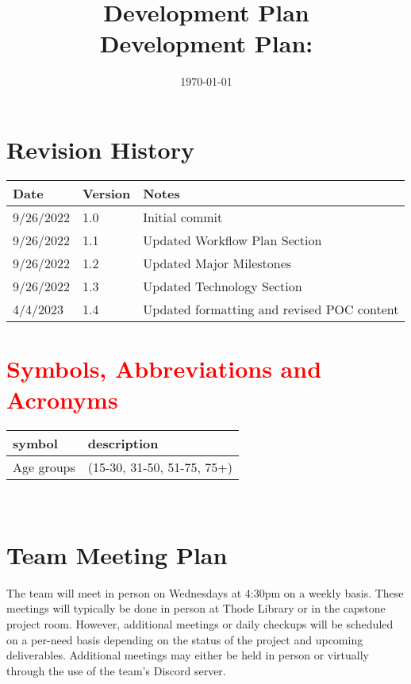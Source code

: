 \documentclass[12pt, titlepage]{article}
\title{Development Plan\\\progname}
\author{\authname}
\date{}
\begin{document}
\title{Development Plan: \progname} 
\author{\authname}
\date{\today}
	
\maketitle


\section*{Revision History}

\begin{tabularx}{\textwidth}{p{3cm}p{2cm}X}
\toprule {\bf Date} & {\bf Version} & {\bf Notes}\\
\midrule
9/26/2022 & 1.0 & Initial commit\\
9/26/2022 & 1.1 & Updated Workflow Plan Section\\
9/26/2022 & 1.2 & Updated Major Milestones\\
9/26/2022 & 1.3 & Updated Technology Section\\
4/4/2023 & 1.4 & Updated formatting and revised POC content\\
\bottomrule
\end{tabularx}

\newpage

\tableofcontents

\listoffigures

\listoftables

\newpage
\section*{\textcolor{red}{Symbols, Abbreviations and Acronyms}}


\renewcommand{\arraystretch}{1.2}
\begin{tabular}{l l} 
  \toprule		
  \textbf{symbol} & \textbf{description}\\
  \midrule 
  Age groups & (15-30, 31-50, 51-75, 75+)\\
  \bottomrule
\end{tabular}\\

\newpage


\section{Team Meeting Plan}
The team will meet in person on Wednesdays at 4:30pm on a weekly basis. These meetings will typically be done in person at Thode Library or in the capstone project room. However, additional meetings or daily checkups will be scheduled on a per-need basis depending on the status of the project and upcoming deliverables. Additional meetings may either be held in person or virtually through the use of the team’s Discord server.
\end{document}
